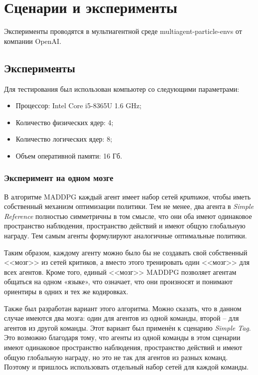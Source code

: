 \chapter{Сценарии и эксперименты}

Эксперименты проводятся в мультиагентной среде multiagent-particle-envs \cite{multiagent-particle-envs} от компании OpenAI.


\section{Эксперименты}

Для тестирования был использован компьютер со следующими параметрами:

\begin{itemize}
    \item Процессор: Intel Core i5-8365U 1.6 GHz;
    \item Количество физических ядер: 4;
    \item Количество логических ядер: 8;
    \item Объем оперативной памяти: 16 Гб.
\end{itemize}

\subsection{Эксперимент на одном мозге}

В алгоритме MADDPG каждый агент имеет набор сетей \textit{критиков}, чтобы иметь собственный механизм оптимизации политики. Тем не менее, два агента в \textit{Simple Reference} полностью симметричны в том смысле, что они оба имеют одинаковое пространство наблюдения, пространство действий и имеют общую глобальную награду. Тем самым агенты формулируют аналогичные оптимальные политики.

Таким образом, каждому агенту можно было бы не создавать свой собственный <<мозг>> из сетей критиков, а вместо этого тренировать один <<мозг>> для всех агентов. Кроме того, единый <<мозг>> MADDPG позволяет агентам общаться на одном «языке», что означает, что они произносят и понимают ориентиры в одних и тех же кодировках.

Также был разработан вариант этого алгоритма. Можно сказать, что в данном случае имеются два мозга: один для агентов из одной команды, второй – для агентов из другой команды. Этот вариант был применён к сценарию \textit{Simple Tag}. Это возможно благодаря тому, что агенты из одной команды в этом сценарии имеют одинаковое пространство наблюдения, пространство действий и имеют общую глобальную награду, но это не так для агентов из разных команд. Поэтому и пришлось использовать отдельный набор сетей для каждой команды.

